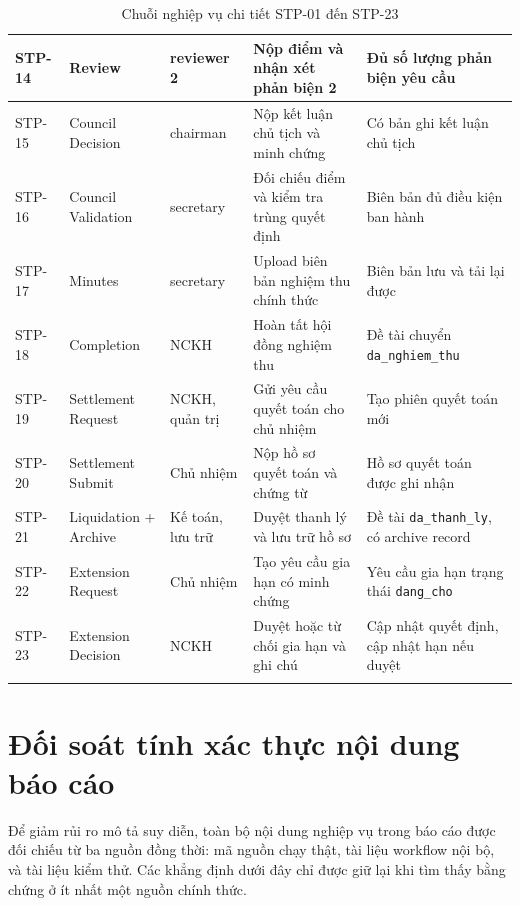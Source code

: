 \documentclass[12pt,a4paper]{report}
\begin{document}
\begin{longtable}{|C{1.0cm}|L{2.6cm}|L{2.6cm}|L{4.2cm}|L{3.0cm}|}
STP-14 & Review & reviewer 2 & Nộp điểm và nhận xét phản biện 2 & Đủ số lượng phản biện yêu cầu \\ \hline
STP-15 & Council Decision & chairman & Nộp kết luận chủ tịch và minh chứng & Có bản ghi kết luận chủ tịch \\ \hline
STP-16 & Council Validation & secretary & Đối chiếu điểm và kiểm tra trùng quyết định & Biên bản đủ điều kiện ban hành \\ \hline
STP-17 & Minutes & secretary & Upload biên bản nghiệm thu chính thức & Biên bản lưu và tải lại được \\ \hline
STP-18 & Completion & NCKH & Hoàn tất hội đồng nghiệm thu & Đề tài chuyển \texttt{da\_nghiem\_thu} \\ \hline
STP-19 & Settlement Request & NCKH, quản trị & Gửi yêu cầu quyết toán cho chủ nhiệm & Tạo phiên quyết toán mới \\ \hline
STP-20 & Settlement Submit & Chủ nhiệm & Nộp hồ sơ quyết toán và chứng từ & Hồ sơ quyết toán được ghi nhận \\ \hline
STP-21 & Liquidation + Archive & Kế toán, lưu trữ & Duyệt thanh lý và lưu trữ hồ sơ & Đề tài \texttt{da\_thanh\_ly}, có archive record \\ \hline
STP-22 & Extension Request & Chủ nhiệm & Tạo yêu cầu gia hạn có minh chứng & Yêu cầu gia hạn trạng thái \texttt{dang\_cho} \\ \hline
STP-23 & Extension Decision & NCKH & Duyệt hoặc từ chối gia hạn và ghi chú & Cập nhật quyết định, cập nhật hạn nếu duyệt \\ \hline
\caption{Chuỗi nghiệp vụ chi tiết STP-01 đến STP-23}
\end{longtable}

\section{Đối soát tính xác thực nội dung báo cáo}
Để giảm rủi ro mô tả suy diễn, toàn bộ nội dung nghiệp vụ trong báo cáo được đối chiếu từ ba nguồn đồng thời: mã nguồn chạy thật, tài liệu workflow nội bộ, và tài liệu kiểm thử. Các khẳng định dưới đây chỉ được giữ lại khi tìm thấy bằng chứng ở ít nhất một nguồn chính thức.
\end{document}
